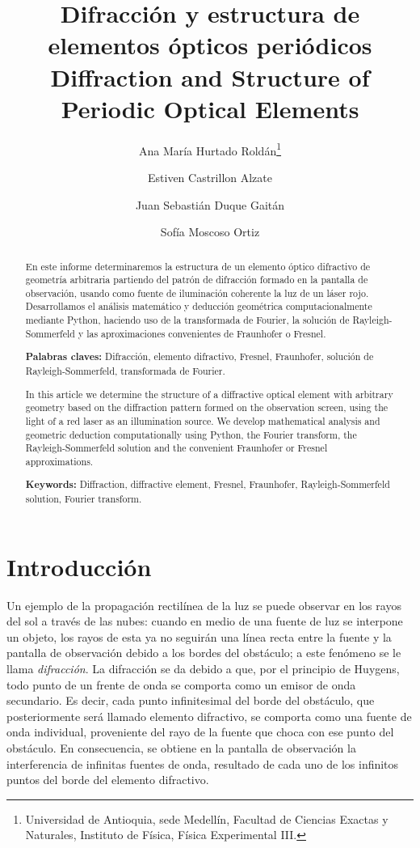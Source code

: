 \documentclass[6pt,a4paper]{article}
\title{Difracción y estructura de elementos ópticos periódicos\\
\small Diffraction and Structure of Periodic Optical Elements}
\author{\small
  Ana María Hurtado Roldán\thanks{Universidad de Antioquia, sede Medellín, Facultad de Ciencias Exactas y Naturales, Instituto de Física, Física Experimental III.} \and
  \small Estiven Castrillon Alzate\footnotemark[1] \and
  \small Juan Sebastián Duque Gaitán\footnotemark[1] \and
  \small Sofía Moscoso Ortiz\footnotemark[1]
}
\date{}
\begin{document}
\maketitle

\begin{abstract}
En este informe determinaremos la estructura de un elemento óptico difractivo de geometría arbitraria partiendo del patrón de difracción formado en la pantalla de observación, usando como fuente de iluminación coherente la luz de un láser rojo. Desarrollamos el análisis matemático y deducción geométrica computacionalmente mediante Python, haciendo uso de la transformada de Fourier, la solución de Rayleigh-Sommerfeld y las aproximaciones convenientes de Fraunhofer o Fresnel.

\medskip
\textbf{Palabras claves:} Difracción, elemento difractivo, Fresnel, Fraunhofer, solución de Rayleigh-Sommerfeld, transformada de Fourier.
\end{abstract}

\begin{abstract}
In this article we determine the structure of a diffractive optical element with arbitrary geometry based on the diffraction pattern formed on the observation screen, using the light of a red laser as an illumination source. We develop mathematical analysis and geometric deduction computationally using Python, the Fourier transform, the Rayleigh-Sommerfeld solution and the convenient Fraunhofer or Fresnel approximations.

\medskip
\textbf{Keywords:} Diffraction, diffractive element, Fresnel, Fraunhofer, Rayleigh-Sommerfeld solution, Fourier transform.
\end{abstract}


\section{Introducción}
Un ejemplo de la propagación rectilínea de la luz se puede observar en los rayos del sol a través de las nubes: cuando en medio de una fuente de luz se interpone un objeto, los rayos de esta ya no seguirán una línea recta entre la fuente y la pantalla de observación debido a los bordes del obstáculo; a este fenómeno se le llama \emph{difracción}. La difracción se da debido a que, por el principio de Huygens, todo punto de un frente de onda se comporta como un emisor de onda secundario. Es decir, cada punto infinitesimal del borde del obstáculo, que posteriormente será llamado elemento difractivo, se comporta como una fuente de onda individual, proveniente del rayo de la fuente que choca con ese punto del obstáculo. En consecuencia, se obtiene en la pantalla de observación la interferencia de infinitas fuentes de onda, resultado de cada uno de los infinitos puntos del borde del elemento difractivo.
\end{document}
